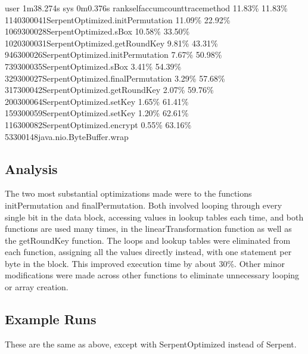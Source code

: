 \documentclass[12pt]{article} %
\newcommand{\tab}{\hspace*{2em}}
\begin{document}
\newline user	1m38.274s
\newline sys	0m0.376s
\newline rank\tab   self\tab  accum\tab   count\tab trace\tab method
\tab 11.83\tab\% 11.83\tab\%    1140\tab 300041\tab SerpentOptimized.initPermutation
\tab 11.09\tab\% 22.92\tab\%    1069\tab 300028\tab SerpentOptimized.sBox
\tab 10.58\tab\% 33.50\tab\%    1020\tab 300031\tab SerpentOptimized.getRoundKey
\tab  9.81\tab\% 43.31\tab\%     946\tab 300026\tab SerpentOptimized.initPermutation
\tab  7.67\tab\% 50.98\tab\%     739\tab 300035\tab SerpentOptimized.sBox
\tab  3.41\tab\% 54.39\tab\%     329\tab 300027\tab SerpentOptimized.finalPermutation
\tab  3.29\tab\% 57.68\tab\%     317\tab 300042\tab SerpentOptimized.getRoundKey
\tab  2.07\tab\% 59.76\tab\%     200\tab 300064\tab SerpentOptimized.setKey
\tab  1.65\tab\% 61.41\tab\%     159\tab 300059\tab SerpentOptimized.setKey
\tab  1.20\tab\% 62.61\tab\%     116\tab 300082\tab SerpentOptimized.encrypt
\tab  0.55\tab\% 63.16\tab\%      53\tab 300148\tab java.nio.ByteBuffer.wrap

\subsection{Analysis}
The two most substantial optimizations made were to the functions initPermutation and finalPermutation. Both involved looping through every single bit in the data block, accessing values in lookup tables each time, and both functions are used many times, in the linearTransformation function as well as the getRoundKey function. The loops and lookup tables were eliminated from each function, assigning all the values directly instead, with one statement per byte in the block. This improved execution time by about 30\%. Other minor modifications were made across other functions to eliminate unnecessary looping or array creation.
\subsection{Example Runs}
These are the same as above, except with SerpentOptimized instead of Serpent.
\end{document}
